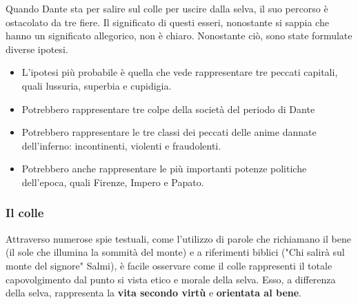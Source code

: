 \documentclass[10pt,a4paper]{article}
\begin{document}
 		Quando Dante sta per salire sul colle per uscire dalla selva, il suo percorso è ostacolato da tre fiere. Il significato di questi esseri, nonostante si sappia che hanno un significato allegorico, non è chiaro. Nonostante ciò, sono state formulate diverse ipotesi. 
 		\begin{itemize}
 			\item L'ipotesi più probabile è quella che vede rappresentare tre peccati capitali, quali lussuria, superbia e cupidigia.
 			\item Potrebbero rappresentare tre colpe della società del periodo di Dante
 			\item Potrebbero rappresentare le tre classi dei peccati delle anime dannate dell'inferno: incontinenti, violenti e fraudolenti.
 			\item Potrebbero anche rappresentare le più importanti potenze politiche dell'epoca, quali Firenze, Impero e Papato.  
 		\end{itemize}
 	
 		\subsubsection{Il colle}
 		
 		Attraverso numerose spie testuali, come l'utilizzo di parole che richiamano il bene (il sole che illumina la sommità del monte) e a riferimenti biblici ("Chi salirà sul monte del signore" Salmi), è facile osservare come il colle rappresenti il totale capovolgimento dal punto si vista etico e morale della selva. Esso, a differenza della selva, rappresenta la \textbf{vita secondo virtù} e \textbf{orientata al bene}.
 	
\end{document}
